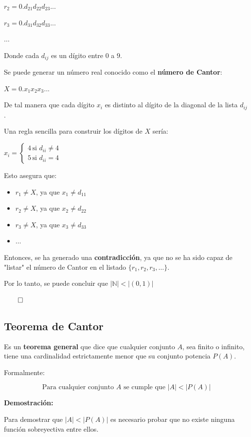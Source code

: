 \documentclass{article}
\begin{document}
$r_2 = 0.d_{21}d_{22}d_{23}...$

$r_3 = 0.d_{31}d_{32}d_{33}...$

$\dots$

Donde cada $d_{ij}$ es un dígito entre $0$ a $9$.

Se puede generar un número real conocido como el \textbf{número de Cantor}:

$X = 0.x_1x_2x_3...$

De tal manera que cada dígito $x_i$ es distinto al dígito de la diagonal de la lista $d_{ij}$.

Una regla sencilla para construir los dígitos de $X$ sería:

$
x_i = 
\begin{cases}
    4 \, \text{si } d_{ii} \neq 4 \\
    5 \, \text{si } d_{ii} = 4
\end{cases}
$

Esto asegura que:

\begin{itemize}
    \item $r_1 \neq X$, ya que $x_1 \neq d_{11}$
    \item $r_2 \neq X$, ya que $x_2 \neq d_{22}$
    \item $r_3 \neq X$, ya que $x_3 \neq d_{33}$
    \item $\dots$
\end{itemize}

Entonces, se ha generado una \textbf{contradicción}, ya que no se ha sido capaz de "listar" el número de Cantor en el listado $\{r_1, r_2, r_3, \dots\}$.

Por lo tanto, se puede concluir que $\left|\mathbb{N}\right| < \left|(0, 1)\right|$

$\qed$

\subsection{Teorema de Cantor}

Es un \textbf{teorema general} que dice que cualquier conjunto $A$, sea finito o infinito, tiene una cardinalidad estrictamente menor que su conjunto potencia $P(A)$.

Formalmente:

\[\text{Para cualquier conjunto } A \text{ se cumple que } \left|A\right| < \left|P(A)\right|\]

\textbf{Demostración:}

Para demostrar que $\left|A\right| < \left|P(A)\right|$ es necesario probar que no existe ninguna función sobreyectiva entre ellos.
\end{document}
